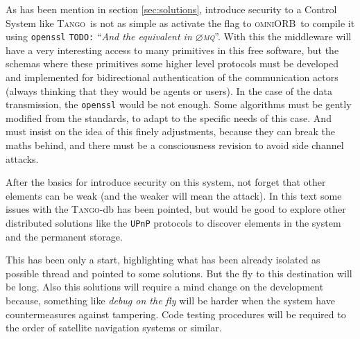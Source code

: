 \documentclass[10pt,a4paper,twoside]{llncs}
\newcommand{\todo}[1]{\texttt{\color{red}TODO:} ``\emph{#1}''}
\newcommand{\tango}{\textsc{Tango}}
\newcommand{\omniorb}{\textsc{omniORB}}
\newcommand{\zmq}{\textsc{$\varnothing$mq}}
\begin{document}
As has been mention in section \ref{sec:solutions}, introduce security to a Control System like \tango\, is not as simple as activate the flag to \omniorb\, to compile it using {\tt openssl} \todo{And the equivalent in \zmq}. With this the middleware will have a very interesting access to many primitives in this free software, but the schemas where these primitives some higher level protocols must be developed and implemented for bidirectional authentication of the communication actors (always thinking that they would be agents or users). In the case of the data transmission, the {\tt openssl} would be not enough. Some algorithms must be gently modified from the standards, to adapt to the specific needs of this case. And must insist on the idea of this finely adjustments, because they can break the maths behind, and there must be a consciousness revision to avoid side channel attacks.

After the basics for introduce security on this system, not forget that other elements can be weak (and the weaker will mean the attack). In this text some issues with the \tango-db has been pointed, but would be good to explore other distributed solutions like the {\tt UPnP} protocols to discover elements in the system and the permanent storage.

This has been only a start, highlighting what has been already isolated as possible thread and pointed to some solutions. But the fly to this destination will be long. Also this solutions will require a mind change on the development because, something like \emph{debug on the fly} will be harder when the system have countermeasures against tampering. Code testing procedures will be required to the order of satellite navigation systems or similar.



\end{document}

